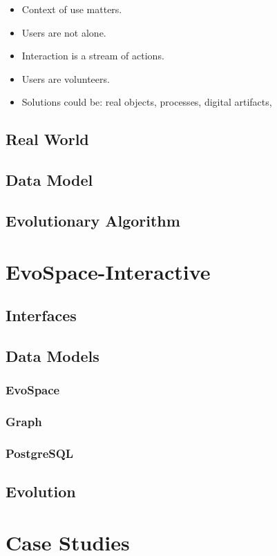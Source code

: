 \begin{itemize}
\item Context of use matters.
\item Users are not alone.
\item Interaction is a stream of actions.
\item Users are volunteers.
\item Solutions could be: real objects, processes, digital artifacts,   
\end{itemize}


  \subsection{Real World}
  \subsection{Data Model}
  \subsection{Evolutionary Algorithm}

\section{EvoSpace-Interactive}
  \subsection{Interfaces}
  \subsection{Data Models}
    \subsubsection{EvoSpace}
    \subsubsection{Graph}
    \subsubsection{PostgreSQL}
  \subsection{Evolution}

\section{Case Studies}
